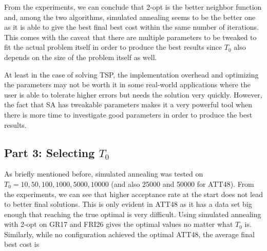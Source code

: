 From the experiments, we can conclude that 2-opt is the better neighbor function and, among the two algorithms, simulated annealing seems to be the better one as it is able to give the best final best cost within the same number of iterations. This comes with the caveat that there are multiple parameters to be tweaked to fit the actual problem itself in order to produce the best results since \(T_0\) also depends on the size of the problem itself as well.

At least in the case of solving TSP, the implementation overhead and optimizing the parameters may not be worth it in some real-world applications where the user is able to tolerate higher errors but needs the solution very quickly. However, the fact that SA has tweakable parameters makes it a very powerful tool when there is more time to investigate good parameters in order to produce the best results.

\subsection*{Part 3: Selecting \(T_0\)}

As briefly mentioned before, simulated annealing was tested on \(T_0 = 10, 50, 100, 1000, 5000, 10000\) (and also 25000 and 50000 for ATT48). From the experiments, we can see that higher acceptance rate at the start does not lead to better final solutions. This is only evident in ATT48 as it has a data set big enough that reaching the true optimal is very difficult. Using simulated annealing with 2-opt on GR17 and FRI26 gives the optimal values no matter what \(T_0\) is. Similarly, while no configuration achieved the optimal ATT48, the average final best cost is 


